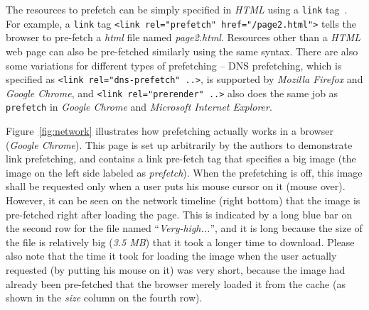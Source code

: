 The resources to prefetch can be simply specified in {\it HTML} using a {\tt link} tag~\cite{nottingham2010}.
For example, a {\tt link} tag {\tt <link rel="p\-refetch" href="/page2.html">} tells the browser to pre-fetch a {\it html} file named {\it page2.html}.
Resources other than a {\it HTML} web page can also be pre-fetched similarly using the same syntax.
There are also some variations for different types of prefetching -- DNS prefetching, which is specified as {\tt <link rel="dns-prefetch" ..>}, is supported by {\it Mozilla Firefox} and {\it Google Chrome}, and {\tt <link rel="prerender" ..>} also does the same job as {\tt prefetch} in {\it Google Chrome} and {\it Microsoft Internet Explorer}.

Figure~\ref{fig:network} illustrates how prefetching actually works in a browser ({\it Google Chrome}).
This page is set up arbitrarily by the authors to demonstrate link prefetching, and contains a link pre-fetch tag that specifies a big image (the image on the left side labeled as {\it prefetch}).
When the prefetching is off, this image shall be requested only when a user puts his mouse cursor on it (mouse over).
However, it can be seen on the network timeline (right bottom) that the image is pre-fetched right after loading the page.
This is indicated by a long blue bar on the second row for the file named ``{\it Very-high...}'', and it is long because the size of the file is relatively big ({\it 3.5 MB}) that it took a longer time to download.
Please also note that the time it took for loading the image when the user actually requested (by putting his mouse on it) was very short, because the image had already been pre-fetched that the browser merely loaded it from the cache (as shown in the {\it size} column on the fourth row).

